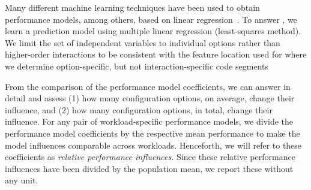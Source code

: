 Many different machine learning techniques have been used to obtain performance models, among others, based on linear regression~\cite{perLasso,siegmundPerformanceinfluenceModelsHighly2015,dorn2020}. To answer , we learn a prediction model using multiple linear regression (least-squares method). We limit the set of independent variables to individual options rather than higher-order interactions to be consistent with the feature location used for  where we determine option-specific, but not interaction-specific code segments

From the comparison of the performance model coefficients, we can answer  in detail and assess (1) how many configuration options, on average, change their influence, and (2) how many configuration options, in total, change their influence. For any pair of workload-specific performance models, we divide the performance model coefficients by the respective mean performance to make the model influences comparable across workloads. Henceforth, we will refer to these coefficients as \textit{relative performance influences.} Since these relative performance influences have been divided by the population mean, we report these without any unit.


